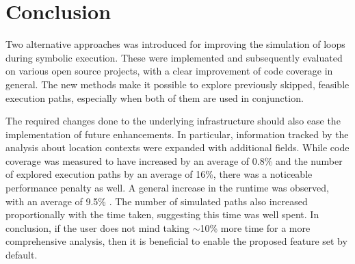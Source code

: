 
\section{Conclusion}

Two alternative approaches was introduced for improving the simulation of loops during symbolic 
execution. These were implemented and subsequently evaluated on various open 
source projects, with a clear improvement of code coverage in general. The new methods make it possible to explore previously skipped, feasible execution paths, especially when both of them are used in conjunction.

The required changes done to the underlying infrastructure should also ease the 
implementation of future enhancements. In particular, information tracked by the 
analysis about location contexts were expanded with additional fields.
While code coverage was measured to have increased by an average of 0.8\% and the 
number of explored execution paths by an average of 16\%, there 
was a noticeable performance penalty as well. A general increase in the runtime was observed, with an average of 9.5\% . The number of simulated paths also increased proportionally with the time taken, suggesting this time was well 
spent. In conclusion, if the user does not mind taking $\sim$10\% more time
for a more comprehensive analysis, then it is beneficial to enable the proposed
feature set by default. 